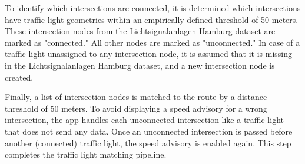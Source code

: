 To identify which intersections are connected, it is determined which intersections have traffic light geometries within an empirically defined threshold of 50 meters. These intersection nodes from the Lichtsignalanlagen Hamburg dataset are marked as "connected." All other nodes are marked as "unconnected." In case of a traffic light unassigned to any intersection node, it is assumed that it is missing in the Lichtsignalanlagen Hamburg dataset, and a new intersection node is created. 

Finally, a list of intersection nodes is matched to the route by a distance threshold of 50 meters. To avoid displaying a speed advisory for a wrong intersection, the app handles each unconnected intersection like a traffic light that does not send any data. Once an unconnected intersection is passed before another (connected) traffic light, the speed advisory is enabled again. This step completes the traffic light matching pipeline.


